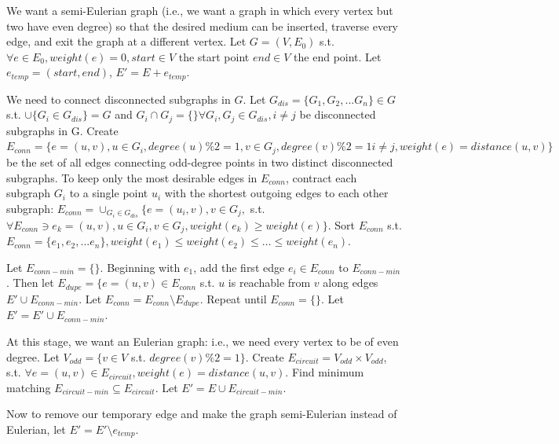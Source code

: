 We want a semi-Eulerian graph (i.e., we want a graph in which every vertex but two have even degree) so that the desired medium can be inserted, traverse every edge, and exit the graph at a different vertex.  Let $G=(V,E_0)$ s.t. $\forall e \in E_0, weight(e)=0, start \in V $ the start point $end \in V$ the end point.  Let $e_{temp} = (start, end)$, $E' = E + e_{temp}$.

We need to connect disconnected subgraphs in $G$.  Let $G_{dis} = \{G_1, G_2, ... G_n\} \in G$ s.t. $\cup{\{G_i \in G_{dis}\}} = G$ and $G_i \cap G_j  = \{ \} \forall G_i, G_j \in G_{dis}, i\neq j$ be disconnected subgraphs in G.  Create $E_{conn} = \{e = (u, v), u \in G_i, degree(u)\%2 = 1, v \in G_j, degree(v) \%2 = 1 i \neq j, weight(e) = distance(u, v)\}$ be the set of all edges connecting odd-degree points in two distinct disconnected subgraphs.  To keep only the most desirable edges in $E_{conn}$, contract each subgraph $G_i$ to a single point $u_i$ with the shortest outgoing edges to each other subgraph: $E_{conn} = \cup_{G_i \in G_{dis}} \{e=(u_i, v), v \in G_j,$ s.t. $\forall E_{conn} \ni e_k = (u, v), u \in G_i, v \in G_j, weight(e_k) \geq weight(e)\}$.  Sort $E_{conn}$ s.t. $E_{conn} = \{e_1, e_2, ... e_n\}, weight(e_1) \leq weight(e_2) \leq \ldots \leq weight(e_n)$.

Let $E_{conn-min} = \{ \}$.  Beginning with $e_1$, add the first edge $e_i \in E_{conn}$ to $E_{conn-min}$.  Then let $E_{dupe} = \{ e = (u, v) \in E_{conn}$ s.t. $u$  is reachable from $v$ along edges $E' \cup E_{conn-min}$.  Let $E_{conn} = E_{conn} \setminus E_{dupe}$.  Repeat until $E_{conn} = \{ \}$.  Let $E' = E' \cup E_{conn-min}$.

At this stage, we want an Eulerian graph: i.e., we need every vertex to be of even degree.  Let $V_{odd} = \{ v \in V$ s.t. $degree(v) \% 2 = 1 \}$.  Create $E_{circuit} = V_{odd} \times V_{odd}$, s.t. $\forall e=(u,v) \in E_{circuit}, weight(e) = distance(u, v)$.  Find minimum matching $E_{circuit-min} \subseteq E_{circuit}$.  Let $E' = E \cup E_{circuit-min}$.

Now to remove our temporary edge and make the graph semi-Eulerian instead of Eulerian, let $E' = E' \setminus e_{temp}$.

